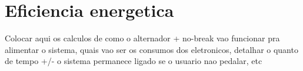 \section{Eficiencia energetica}
Colocar aqui os calculos de como o alternador + no-break vao funcionar pra alimentar o sistema, quais vao ser os consumos dos eletronicos, detalhar o quanto de tempo +/- o sistema permanece ligado se o usuario nao pedalar, etc
